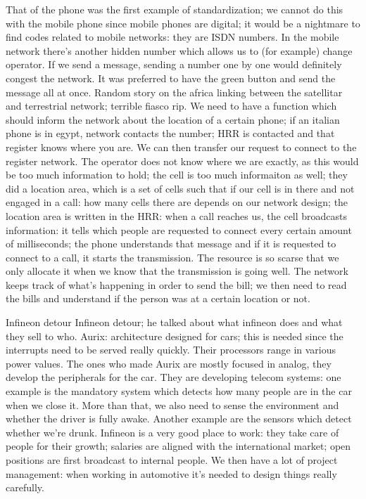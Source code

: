 {{{{{That of the phone was the first example of standardization; we cannot do this with the mobile phone since mobile phones are digital; it would be a nightmare to find codes related to mobile networks: they are ISDN numbers. In the mobile network there's another hidden number which allows us to (for example) change operator.
If we send a message, sending a number one by one would definitely congest the network. It was preferred to have the green button and send the message all at once.
Random story on the africa linking between the satellitar and terrestrial network;
terrible fiasco rip.
We need to have a function which should inform the network about the location of a certain phone; if an italian phone is in egypt, network contacts the number; HRR is contacted and that register knows where you are.
We can then transfer our request to connect to the register network.
The operator does not know where we are exactly, as this would be too much information to hold; the cell is too much informaiton as well; they did a location area,
which is a set of cells such that if our cell is in there and not engaged in a call: how many cells there are depends on our network design; the location area is written in the HRR: when a call reaches us, the cell broadcasts information: it tells which people are requested to connect every certain amount of milliseconds; the phone understands that message and if it is requested to connect to a call, it starts the transmission. The resource is so scarse that we only allocate it when we know that the transmission is going well.
The network keeps track of what's happening in order to send the bill; we then need to read the bills and understand if the person was at a certain location or not.

Infineon detour Infineon detour; he talked about what infineon does and what they sell to who.
Aurix: architecture designed for cars; this is needed since the interrupts need to be served really quickly. Their processors range in various power values. The ones who made Aurix are mostly focused in analog, they develop the peripherals for the car.
They are developing telecom systems: one example is the mandatory system which detects how many people are in the car when we close it. More than that, we also need to sense the environment and whether the driver is fully awake.
Another example are the sensors which detect whether we're drunk.
Infineon is a very good place to work: they take care of people for their growth; salaries are aligned with the international market; open positions are first broadcast to internal people. We then have a lot of project management: when working in automotive it's needed to design things really carefully.

}}}}}
